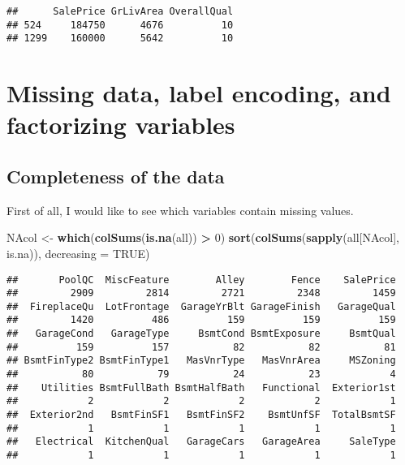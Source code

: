 \documentclass[]{article}
\newenvironment{Shaded}{\begin{snugshade}}{\end{snugshade}}
\newcommand{\KeywordTok}[1]{\textcolor[rgb]{0.13,0.29,0.53}{\textbf{#1}}}
\newcommand{\DataTypeTok}[1]{\textcolor[rgb]{0.13,0.29,0.53}{#1}}
\newcommand{\DecValTok}[1]{\textcolor[rgb]{0.00,0.00,0.81}{#1}}
\newcommand{\StringTok}[1]{\textcolor[rgb]{0.31,0.60,0.02}{#1}}
\newcommand{\OtherTok}[1]{\textcolor[rgb]{0.56,0.35,0.01}{#1}}
\newcommand{\OperatorTok}[1]{\textcolor[rgb]{0.81,0.36,0.00}{\textbf{#1}}}
\newcommand{\NormalTok}[1]{#1}
\begin{document}
\begin{verbatim}
##      SalePrice GrLivArea OverallQual
## 524     184750      4676          10
## 1299    160000      5642          10
\end{verbatim}

\section{Missing data, label encoding, and factorizing
variables}\label{missing-data-label-encoding-and-factorizing-variables}

\subsection{Completeness of the data}\label{completeness-of-the-data}

First of all, I would like to see which variables contain missing
values.

\begin{Shaded}
\begin{Highlighting}[]
\NormalTok{NAcol <-}\StringTok{ }\KeywordTok{which}\NormalTok{(}\KeywordTok{colSums}\NormalTok{(}\KeywordTok{is.na}\NormalTok{(all)) }\OperatorTok{>}\StringTok{ }\DecValTok{0}\NormalTok{)}
\KeywordTok{sort}\NormalTok{(}\KeywordTok{colSums}\NormalTok{(}\KeywordTok{sapply}\NormalTok{(all[NAcol], is.na)), }\DataTypeTok{decreasing =} \OtherTok{TRUE}\NormalTok{)}
\end{Highlighting}
\end{Shaded}

\begin{verbatim}
##       PoolQC  MiscFeature        Alley        Fence    SalePrice 
##         2909         2814         2721         2348         1459 
##  FireplaceQu  LotFrontage  GarageYrBlt GarageFinish   GarageQual 
##         1420          486          159          159          159 
##   GarageCond   GarageType     BsmtCond BsmtExposure     BsmtQual 
##          159          157           82           82           81 
## BsmtFinType2 BsmtFinType1   MasVnrType   MasVnrArea     MSZoning 
##           80           79           24           23            4 
##    Utilities BsmtFullBath BsmtHalfBath   Functional  Exterior1st 
##            2            2            2            2            1 
##  Exterior2nd   BsmtFinSF1   BsmtFinSF2    BsmtUnfSF  TotalBsmtSF 
##            1            1            1            1            1 
##   Electrical  KitchenQual   GarageCars   GarageArea     SaleType 
##            1            1            1            1            1
\end{verbatim}
\end{document}
